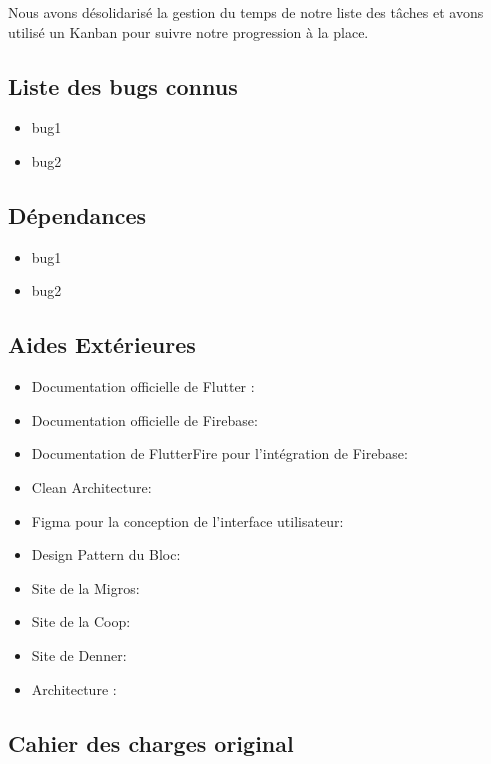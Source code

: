 Nous avons désolidarisé la gestion du temps de notre liste des tâches et avons utilisé un Kanban pour suivre notre progression à la place.

\subsection{Liste des bugs connus}

\begin{itemize}[noitemsep]
    \item bug1
    \item bug2
\end{itemize}

\subsection{Dépendances}

\begin{itemize}[noitemsep]
    \item bug1
    \item bug2
\end{itemize}

\subsection{Aides Extérieures}

\begin{itemize}[noitemsep]
    \item Documentation officielle de Flutter : \cite{flutterDocs}
    \item Documentation officielle de Firebase: \cite{firebaseDocs}
    \item Documentation de FlutterFire pour l'intégration de Firebase: \cite{flutterFireDocs}
    \item Clean Architecture: \cite{cleanArchitecture}
    \item Figma pour la conception de l'interface utilisateur: \cite{figma}
    \item Design Pattern du Bloc: \cite{blocPattern}
    \item Site de la Migros: \cite{migros}
    \item Site de la Coop: \cite{coop}
    \item Site de Denner: \cite{denner}
    \item Architecture : \cite{googleCloudArchitecture}
\end{itemize}


\subsection{Cahier des charges original}


